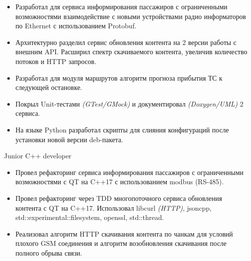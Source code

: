 {    \smallskip
    \begin{itemize}

        \item
            Разработал для сервиса информирования пассажиров с ограниченными возможностями
            взаимодействие с новыми устройствами радио информаторов по Ethernet с использованием
            Protobuf.

        \item
            Архитектурно разделил сервис обновления контента на 2 версии работы с внешним API.
            Расширил спектр скачиваемого контента, увеличив количество потоков и HTTP запросов.

        \item
            Разработал для модуля маршрутов алгоритм прогноза прибытия ТС к следующей остановке.

        \item
            Покрыл Unit-тестами \textit{(GTest/GMock)} и документировал \textit{(Doxygen/UML)}
            2 сервиса.

        \item
            На языке Python разработал скрипты для слияния конфигураций после установки новой версии
            deb-пакета.


    \end{itemize}


    \cvexperiencePosition
        {Junior C++ developer}

    \cvexperiencePeriod
        {}

    \smallskip
    \begin{itemize}

        \item
            Провел рефакторинг сервиса информирования пассажиров с ограниченными возможностями
            с QT на C++17 с использованием modbus (RS-485).

        \item
            Провел рефакторинг через TDD многопоточного сервиса обновления контента с QT на C++17.
            Использовал libcurl \textit{(HTTP)}, jsoncpp, std::experimental::filesystem, openssl,
            std::thread.

        \item
            Реализовал алгоритм HTTP скачивания контента по чанкам для условий плохого GSM
            соединения и алгоритм возобновления скачивания после полного обрыва связи.


\end{itemize}}
